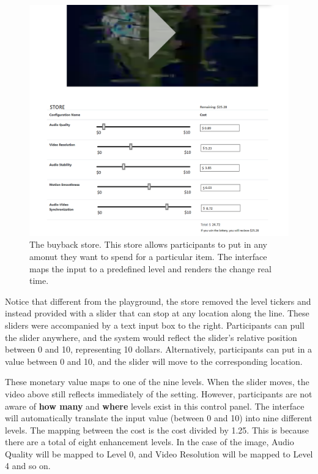 \begin{figure}[htpb]
    \centering
    \includegraphics[width=\textwidth, keepaspectratio=true]{content/image/bb_store.png}
    \caption{
        The buyback store. This store allows participants to put in any amonut they want to spend for a particular item. The interface maps the input to a predefined level and renders the change real time.
    }
    \label{fig:exp2_store}
\end{figure}

Notice that different from the playground, the store removed the level tickers and instead provided with a slider that can stop at any location along the line. These sliders were accompanied by a text input box to the right. Participants can pull the slider anywhere, and the system would reflect the slider's relative position between 0 and 10, representing 10 dollars. Alternatively, participants can put in a value between 0 and 10, and the slider will move to the corresponding location.

These monetary value maps to one of the nine levels. When the slider moves, the video above still reflects immediately of the setting. However, participants are not aware of \textbf{how many} and \textbf{where} levels exist in this control panel. The interface will automatically translate the input value (between 0 and 10) into nine different levels. The mapping between the cost is the cost divided by 1.25. This is because there are a total of eight enhancement levels. In the case of the image, Audio Quality will be mapped to Level 0, and Video Resolution will be mapped to Level 4 and so on.

